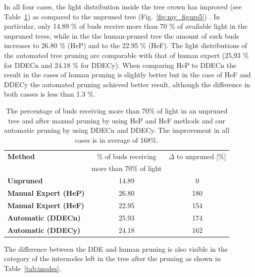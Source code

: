 In all four cases, the light distribution inside the tree crown has
improved (see Table~\ref{tab:light}) as compared to the unpruned tree (Fig.~\ref{fig:my_figure5}) . 
In particular, only 14.89 \% of buds receive more than 70 \% of available light in the unpruned trees, 
while in the the human-pruned tree the amount of such buds increases to 26.80 \% (HeP) and to the 22.95 \% (HeF).
The light distributions of the automated tree pruning are comparable with
that of human expert (25,93 \% for DDECn and 24.18 \% for DDECy). 
When comparing HeP to DDECn the result in the cases of human pruning is slightly better but in the case of HeF and DDECy the automated pruning achieved better result, although the difference in both casses is less than 1.3 \%.  
\begin{table}
\begin{center}
\begin{tabular}{ |l|c|c| } 
 \hline
 \textbf{Method} & \% of buds receiving                           & $\Delta$ to unpruned [\%] \\ 
                 &  more than 70\% of light                       &  \\ 
 \hline
 \textbf{Unpruned}            & 14.89 & 0 \\ 
 \hline
 \textbf{Manual Expert (HeP)} & 26.80 & 180 \\ 
 \textbf{Manual Expert (HeF)} & 22.95 & 154 \\ 
  \hline
 \textbf{Automatic (DDECn)} & 25.93 & 174 \\ 
 \textbf{Automatic (DDECy)} & 24.18 & 162 \\ 
 \hline
\end{tabular}
\end{center}
\caption{The percentage of buds receiving more than 70\% of light in an unpruned tree and after manual pruning by using HeP and HeF methods and our automatic pruning by using DDECn and DDECy. The improvement in all cases is in average of 168\%. }
\label{tab:light}
\end{table}


The difference between the DDE and human pruning is also visible in the category of the internodes left in the tree after the pruning as shown in Table~\ref{tab:inodes}.

